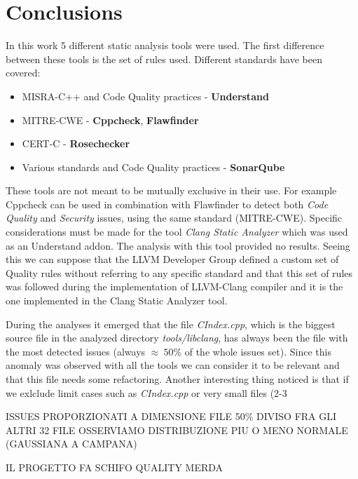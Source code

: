 \chapter{Conclusions}

In this work 5 different static analysis tools were used.\newline
The first difference between these tools is the set of rules used. Different standards have been covered:

\begin{itemize}
	\item MISRA-C++ and Code Quality practices - \textbf{Understand}
	\item MITRE-CWE - \textbf{Cppcheck}, \textbf{Flawfinder}
	\item CERT-C - \textbf{Rosechecker}
	\item Various standards and Code Quality practices - \textbf{SonarQube}
\end{itemize}

These tools are not meant to be mutually exclusive in their use. For example Cppcheck can be used in combination with Flawfinder to detect both \textsl{Code Quality} and \textsl{Security} issues, using the same standard (MITRE-CWE).\newline
Specific considerations must be made for the tool \textsl{Clang Static Analyzer} which was used as an Understand addon.\newline
The analysis with this tool provided no results. Seeing this we can suppose that the LLVM Developer Group defined a custom set of Quality rules without referring to any specific standard and that this set of rules was followed during the implementation of LLVM-Clang compiler and it is the one implemented in the Clang Static Analyzer tool.
\newline\newline

During the analyses it emerged that the file \textsl{CIndex.cpp}, which is the biggest source file in the analyzed directory \textsl{tools/libclang}, has always been the file with the most detected issues (always $\approx\: 50\%$ of the whole issues set). Since this anomaly was observed with all the tools we can consider it to be relevant and that this file needs some refactoring.\newline
Another interesting thing noticed is that if we exlclude limit cases such as \textsl{CIndex.cpp} or very small files (2-3 

ISSUES PROPORZIONATI A DIMENSIONE FILE
50\% DIVISO FRA GLI ALTRI 32 FILE OSSERVIAMO DISTRIBUZIONE PIU O MENO NORMALE (GAUSSIANA A CAMPANA)






IL PROGETTO FA SCHIFO QUALITY MERDA